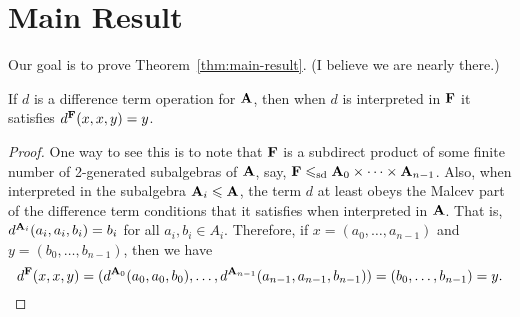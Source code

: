 \section{Main Result}
Our goal is to prove Theorem~\ref{thm:main-result}. 
(I believe we are nearly there.)

\begin{lemma}
  If $d$ is a difference term operation for $\mathbf{A}$,
  then when $d$ is interpreted in $\mathbf{F}$ it satisfies $d^{\mathbf{F}}(x,x,y) = y$.
\end{lemma}
\begin{proof}
One way to see this is to note that $\mathbf{F}$ is a
  subdirect product of some finite number of 2-generated subalgebras of $\mathbf{A}$,
  say, $\mathbf{F} \leqslant_{\mathrm{sd}} \mathbf{A}_0 \times \cdots \times \mathbf{A}_{n-1}$. Also, when interpreted
  in the subalgebra $\mathbf{A}_i \leqslant \mathbf{A}$, the term $d$ at least obeys
  the Malcev part of the difference term conditions that it satisfies when
  interpreted in $\mathbf{A}$.
  That is,   $d^{\mathbf{A}_i}(a_i, a_i, b_i) = b_i$ for all $a_i, b_i \in A_i$.
  Therefore, if $x = (a_0, \dots, a_{n-1})$
  and $y = (b_0, \dots, b_{n-1})$, then we have
  \[d^{\mathbf{F}}(x,x,y) = 
  (d^{\mathbf{A}_0}(a_0, a_0, b_0), \dots,d^{\mathbf{A}_{n-1}}(a_{n-1}, a_{n-1}, b_{n-1}))
  = (b_0, \dots, b_{n-1}) = y.\]
\end{proof}




